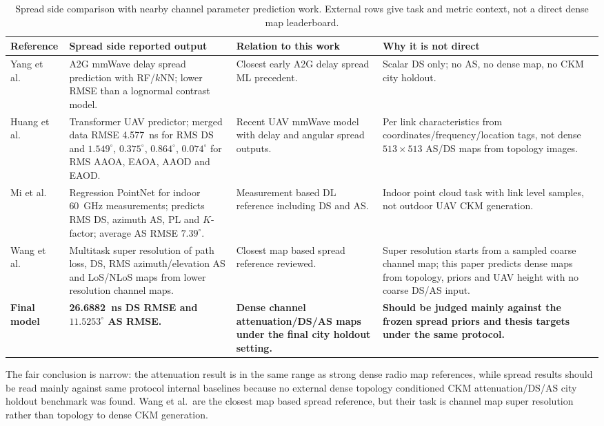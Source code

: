 \documentclass[journal]{IEEEtran}
\begin{document}
\begin{table}[t]
\centering
\caption{Spread side comparison with nearby channel parameter prediction work.
External rows give task and metric context, not a direct dense map leaderboard.}
\label{tab:spread-soa}
\scriptsize
\setlength{\tabcolsep}{3pt}
\begin{tabularx}{\textwidth}{p{}p{}p{}X}
\toprule
Reference & Spread side reported output & Relation to this work & Why it is not direct \\
\midrule
Yang et al.\ \cite{yang2019a2gml} &
A2G mmWave delay spread prediction with RF/\(k\)NN; lower RMSE than a lognormal
contrast model. &
Closest early A2G delay spread ML precedent. &
Scalar DS only; no AS, no dense map, no CKM city holdout. \\
Huang et al.\ \cite{huang2025a2gtransformer} &
Transformer UAV predictor; merged data RMSE \SI{4.577}{ns} for RMS DS and
\(1.549^\circ\), \(0.375^\circ\), \(0.864^\circ\), \(0.074^\circ\) for RMS
AAOA, EAOA, AAOD and EAOD. &
Recent UAV mmWave model with delay and angular spread outputs. &
Per link characteristics from coordinates/frequency/location tags, not dense
\(513\times513\) AS/DS maps from topology images. \\
Mi et al.\ \cite{mi2024pointcloud} &
Regression PointNet for indoor \SI{60}{GHz} measurements; predicts RMS DS,
azimuth AS, PL and \(K\)-factor; average AS RMSE \(7.39^\circ\). &
Measurement based DL reference including DS and AS. &
Indoor point cloud task with link level samples, not outdoor UAV CKM generation. \\
Wang et al.\ \cite{wang2023multitasksr} &
Multitask super resolution of path loss, DS, RMS azimuth/elevation AS and
LoS/NLoS maps from lower resolution channel maps. &
Closest map based spread reference reviewed. &
Super resolution starts from a sampled coarse channel map; this paper predicts
dense maps from topology, priors and UAV height with no coarse DS/AS input. \\
\textbf{Final model} &
\textbf{\SI{26.6882}{ns} DS RMSE and \(11.5253^\circ\) AS RMSE.} &
\textbf{Dense channel attenuation/DS/AS maps under the final city holdout setting.} &
\textbf{Should be judged mainly against the frozen spread priors and thesis
targets under the same protocol.} \\
\bottomrule
\end{tabularx}
\end{table}

The fair conclusion is narrow: the attenuation result is in the same range as
strong dense radio map references, while spread results should be read mainly
against same protocol internal baselines because no external dense topology
conditioned CKM attenuation/DS/AS city holdout benchmark was found. Wang et al.\
are the closest map based spread reference, but their task is channel map super
resolution rather than topology to dense CKM generation.
\end{document}

